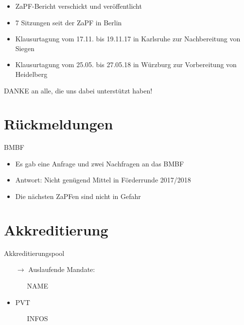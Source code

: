 \documentclass[compress, aspectratio=169]{beamer}
\begin{document}
\begin{frame}
  \begin{itemize}
    \item ZaPF-Bericht verschickt und veröffentlicht
    \item 7 Sitzungen seit der ZaPF in Berlin
    \item Klausurtagung vom 17.11. bis 19.11.17 in Karlsruhe zur Nachbereitung von Siegen
    \item Klausurtagung vom 25.05. bis 27.05.18 in Würzburg zur Vorbereitung von Heidelberg
    \end{itemize}
    \vspace{5mm}
    \begin{center}
      \Large DANKE an alle, die uns dabei unterstützt haben!
    \end{center}
\end{frame}

\section{Rückmeldungen}

\begin{frame}{BMBF}
  \begin{itemize}
     \item Es gab eine Anfrage und zwei Nachfragen an das BMBF
     \item Antwort: Nicht genügend Mittel in Förderrunde 2017/2018
     \item Die nächsten ZaPFen sind nicht in Gefahr
  \end{itemize}
\end{frame}


\section{Akkreditierung}

\begin{frame}{Akkreditierungspool}
  \begin{itemize}
    \item[$\rightarrow$] Auslaufende Mandate:
      \begin{itemize}
          \item [NAME]
      \end{itemize}
    \item PVT
      \begin{itemize}
          \item [INFOS]
      \end{itemize}
    \end{itemize}
\end{frame}
\end{document}
